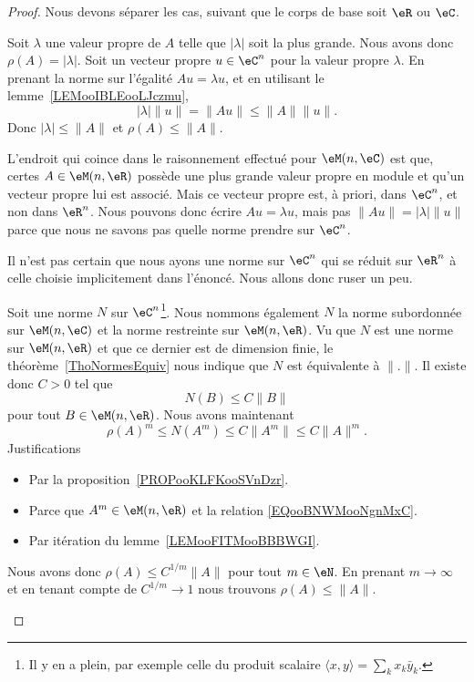 \begin{proof}
	Nous devons séparer les cas, suivant que le corps de base soit \( \eR\) ou \( \eC\).

	\begin{subproof}
		\spitem[Pour \( A\in \eM(n,\eC)\)]
		Soit \( \lambda\) une valeur propre de \( A\) telle que \( | \lambda |\) soit la plus grande. Nous avons donc \( \rho(A)=| \lambda |\). Soit un vecteur propre \( u\in \eC^n\) pour la valeur propre \( \lambda\). En prenant la norme sur l'égalité \( Au=\lambda u\), et en utilisant le lemme~\ref{LEMooIBLEooLJczmu},
		\begin{equation}
			| \lambda |\| u \|=\| Au \|\leq \| A \|\| u \|.
		\end{equation}
		Donc \( | \lambda |\leq \| A \|\) et \( \rho(A)\leq\| A \|\).

		\spitem[Pour \( A\in \eM(n,\eR)\)]

		L'endroit qui coince dans le raisonnement effectué pour \( \eM(n,\eC)\) est que, certes \( A\in \eM(n,\eR)\) possède une plus grande valeur propre en module et qu'un vecteur propre lui est associé. Mais ce vecteur propre est, à priori, dans \( \eC^n\), et non dans \( \eR^n\). Nous pouvons donc écrire \( Au=\lambda u\), mais pas \( \| Au \|=| \lambda |\| u \|\) parce que nous ne savons pas quelle norme prendre sur \( \eC^n\).

		Il n'est pas certain que nous ayons une norme sur \( \eC^n\) qui se réduit sur \( \eR^n\) à celle choisie implicitement dans l'énoncé. Nous allons donc ruser un peu.

		Soit une norme \( N\) sur \( \eC^n\)\footnote{Il y en a plein, par exemple celle du produit scalaire \( \langle x, y\rangle =\sum_kx_k\bar y_k\).}. Nous nommons également \( N\) la norme subordonnée sur \( \eM(n,\eC)\) et la norme restreinte sur \( \eM(n,\eR)\). Vu que \( N\) est une norme sur \( \eM(n,\eR)\) et que ce dernier est de dimension finie, le théorème~\ref{ThoNormesEquiv} nous indique que \( N\) est équivalente à \( \| . \|\). Il existe donc \( C>0\) tel que
		\begin{equation}        \label{EQooBNWMooNgnMxC}
			N(B)\leq C\| B \|
		\end{equation}
		pour tout \( B\in \eM(n,\eR)\). Nous avons maintenant
		\begin{equation}
			\rho(A)^m\leq N(A^m)\leq C\| A^m \|\leq C\| A \|^m.
		\end{equation}
		Justifications
		\begin{itemize}
			\item Par la proposition~\ref{PROPooKLFKooSVnDzr}.
			\item Parce que \( A^m\in \eM(n,\eR)\) et la relation \eqref{EQooBNWMooNgnMxC}.
			\item Par itération du lemme~\ref{LEMooFITMooBBBWGI}.
		\end{itemize}

		Nous avons donc \( \rho(A)\leq C^{1/m}\| A \|\) pour tout \( m\in\eN\). En prenant \( m\to \infty\) et en tenant compte de \( C^{1/m}\to 1\) nous trouvons \( \rho(A)\leq \| A \|\).
	\end{subproof}
\end{proof}

